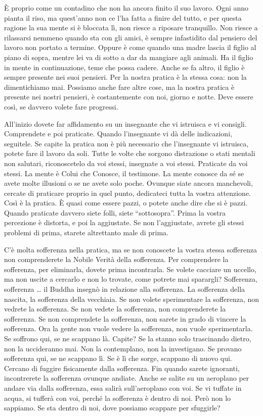 È proprio come un contadino che non ha ancora finito il suo lavoro. Ogni
anno pianta il riso, ma quest'anno non ce l'ha fatta a finire del tutto,
e per questa ragione la sua mente si è bloccata lì, non riesce a
riposare tranquillo. Non riesce a rilassarsi nemmeno quando sta con gli
amici, è sempre infastidito dal pensiero del lavoro non portato a
termine. Oppure è come quando una madre lascia il figlio al piano di
sopra, mentre lei va di sotto a dar da mangiare agli animali. Ha il
figlio in mente in continuazione, teme che possa cadere. Anche se fa
altro, il figlio è sempre presente nei suoi pensieri. Per la nostra
pratica è la stessa cosa: non la dimentichiamo mai. Possiamo anche fare
altre cose, ma la nostra pratica è presente nei nostri pensieri, è
costantemente con noi, giorno e notte. Deve essere così, se davvero
volete fare progressi.

All'inizio dovete far affidamento su un insegnante che vi istruisca e vi
consigli. Comprendete e poi praticate. Quando l'insegnante vi dà delle
indicazioni, seguitele. Se capite la pratica non è più necessario che
l'insegnante vi istruisca, potete fare il lavoro da soli. Tutte le volte
che sorgono distrazione o stati mentali non salutari, riconoscetelo da
voi stessi, insegnate a voi stessi. Praticate da voi stessi. La mente è
Colui che Conosce, il testimone. La mente conosce da sé se avete molte
illusioni o se ne avete solo poche. Ovunque siate ancora manchevoli,
cercate di praticare proprio in quel punto, dedicateci tutta la vostra
attenzione. Così è la pratica. È quasi come essere pazzi, o potete anche
dire che si è pazzi. Quando praticate davvero siete folli, siete
``sottosopra''. Prima la vostra percezione è distorta, e poi la
aggiustate. Se non l'aggiustate, avrete gli stessi problemi di prima,
starete altrettanto male di prima.

C'è molta sofferenza nella pratica, ma se non conoscete la vostra stessa
sofferenza non comprenderete la Nobile Verità della sofferenza. Per
comprendere la sofferenza, per eliminarla, dovete prima incontrarla. Se
volete cacciare un uccello, ma non uscite a cercarlo e non lo trovate,
come potrete mai sparargli? Sofferenza, sofferenza \ldots{} il Buddha insegnò
in relazione alla sofferenza. La sofferenza della nascita, la sofferenza
della vecchiaia. Se non volete sperimentare la sofferenza, non vedrete
la sofferenza. Se non vedete la sofferenza, non comprenderete la
sofferenza. Se non comprendete la sofferenza, non sarete in grado di
vincere la sofferenza. Ora la gente non vuole vedere la sofferenza, non
vuole sperimentarla. Se soffrono qui, se ne scappano là. Capite? Se la
stanno solo trascinando dietro, non la uccideranno mai. Non la
contemplano, non la investigano. Se provano sofferenza qui, se ne
scappano lì. Se è lì che sorge, scappano di nuovo qui. Cercano di
fuggire fisicamente dalla sofferenza. Fin quando sarete ignoranti,
incontrerete la sofferenza ovunque andiate. Anche se salite su un
aeroplano per andare via dalla sofferenza, essa salirà sull'aeroplano
con voi. Se vi tuffate in acqua, si tufferà con voi, perché la
sofferenza è dentro di noi. Però non lo sappiamo. Se sta dentro di noi,
dove possiamo scappare per sfuggirle?

